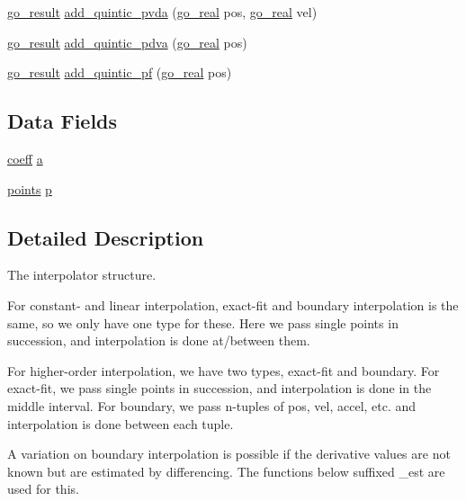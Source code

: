\begin{DoxyCompactItemize}
\hyperlink{gotypes_8h_a55d48b38cd959f63c7e8db8337a9792a}{go\-\_\-result} \hyperlink{classgomotion_1_1go__interp_a59e7e5d11c608888416fe2cf42fda2ca}{add\-\_\-quintic\-\_\-pvda} (\hyperlink{gotypes_8h_afd666a2393eebd71ee455846ac9def9b}{go\-\_\-real} pos, \hyperlink{gotypes_8h_afd666a2393eebd71ee455846ac9def9b}{go\-\_\-real} vel)
\item 
\hyperlink{gotypes_8h_a55d48b38cd959f63c7e8db8337a9792a}{go\-\_\-result} \hyperlink{classgomotion_1_1go__interp_abce6c8b5f08a01a6f465de1b9d2c1f02}{add\-\_\-quintic\-\_\-pdva} (\hyperlink{gotypes_8h_afd666a2393eebd71ee455846ac9def9b}{go\-\_\-real} pos)
\item 
\hyperlink{gotypes_8h_a55d48b38cd959f63c7e8db8337a9792a}{go\-\_\-result} \hyperlink{classgomotion_1_1go__interp_a1cf92b9ce941bc5db54e7bebc369b6b2}{add\-\_\-quintic\-\_\-pf} (\hyperlink{gotypes_8h_afd666a2393eebd71ee455846ac9def9b}{go\-\_\-real} pos)
\end{DoxyCompactItemize}
\subsection*{Data Fields}
\begin{DoxyCompactItemize}
\item 
\hyperlink{structgomotion_1_1coeff}{coeff} \hyperlink{classgomotion_1_1go__interp_a9ae6dc82a4330b5cb02481ac87169e57}{a}
\item 
\hyperlink{structgomotion_1_1points}{points} \hyperlink{classgomotion_1_1go__interp_ac568f2bc77d7c587637c8340669a5937}{p}
\end{DoxyCompactItemize}


\subsection{Detailed Description}
The interpolator structure. 

For constant-\/ and linear interpolation, exact-\/fit and boundary interpolation is the same, so we only have one type for these. Here we pass single points in succession, and interpolation is done at/between them.

For higher-\/order interpolation, we have two types, exact-\/fit and boundary. For exact-\/fit, we pass single points in succession, and interpolation is done in the middle interval. For boundary, we pass n-\/tuples of pos, vel, accel, etc. and interpolation is done between each tuple.

A variation on boundary interpolation is possible if the derivative values are not known but are estimated by differencing. The functions below suffixed \-\_\-est are used for this. 

